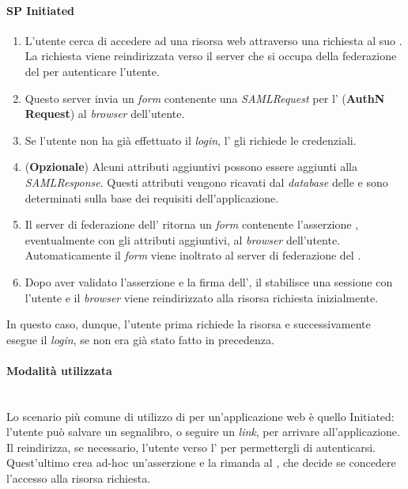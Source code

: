 \paragraph{SP Initiated}
\begin{enumerate}
\item L'utente cerca di accedere ad una risorsa web attraverso una richiesta al suo . La richiesta viene reindirizzata verso il server che si occupa della federazione del  per autenticare l'utente.
\item Questo server invia un \textit{form} contenente una \textit{SAMLRequest} per l' (\textbf{AuthN Request}) al \textit{browser} dell'utente.
\item Se l'utente non ha già effettuato il \textit{login}, l' gli richiede le credenziali.
\item (\textbf{Opzionale}) Alcuni attributi aggiuntivi possono essere aggiunti alla \textit{SAMLResponse}. Questi attributi vengono ricavati dal \textit{database} delle  e sono determinati sulla base dei requisiti dell'applicazione.
\item Il server di federazione dell' ritorna un \textit{form} contenente l'asserzione , eventualmente con gli attributi aggiuntivi, al \textit{browser} dell'utente. Automaticamente il \textit{form} viene inoltrato al server di federazione del .
\item Dopo aver validato l'asserzione e la firma dell', il  stabilisce una sessione con l'utente e il \textit{browser} viene reindirizzato alla risorsa richiesta inizialmente.
\end{enumerate}
In questo caso, dunque, l'utente prima richiede la risorsa e successivamente esegue il \textit{login}, se non era già stato fatto in precedenza.

\paragraph{Modalità utilizzata} \mbox{} \\
Lo scenario più comune di utilizzo di  per un'applicazione web è quello  Initiated: l'utente può salvare un segnalibro, o seguire un \textit{link}, per arrivare all'applicazione. Il  reindirizza, se necessario, l'utente verso l' per permettergli di autenticarsi. Quest'ultimo crea ad-hoc un'asserzione e la rimanda al , che decide se concedere l'accesso alla risorsa richiesta.

